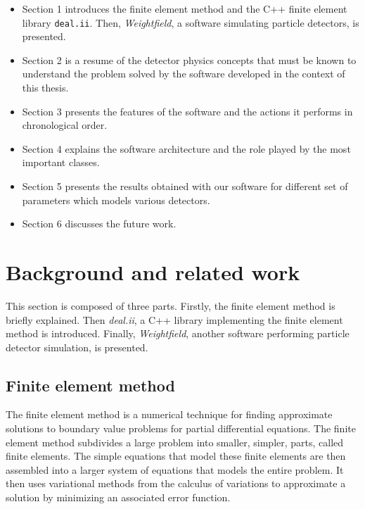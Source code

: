 \documentclass[11pt]{article}
\begin{document}
		\begin{itemize}
			\item Section 1 introduces the finite element method and the
			C++ finite element library \texttt{deal.ii}. Then, \textit{Weightfield},
			a software simulating particle detectors, is presented.
			\item Section 2 is a resume of the detector physics concepts that must be
			known to understand the problem solved by the software developed in the
			context of this thesis.
			\item Section 3 presents the features of the software and the actions
			it performs in chronological order.
			\item Section 4 explains the software architecture and the role played by
			the most important classes.
			\item Section 5 presents the results obtained with our software for
			different set of parameters which models various detectors.
			\item Section 6 discusses the future work.
		\end{itemize}



\section{Background and related work}

	This section is composed of three parts. Firstly,
	the finite element method is briefly explained. Then \textit{deal.ii},
	a C++ library implementing the finite element method is introduced. Finally,
	\textit{Weightfield}, another software performing particle detector simulation,
	is presented.

	\subsection{Finite element method}

		The finite element method is a numerical technique for
		finding approximate solutions to boundary value problems for partial
		differential equations. The finite element method subdivides a large
		problem into smaller, simpler, parts, called finite elements. The
		simple equations that model these finite elements are then assembled
		into a larger system of equations that models the entire problem. It
		then uses variational methods from the calculus of variations to
		approximate a solution by minimizing an associated error function.
\end{document}
